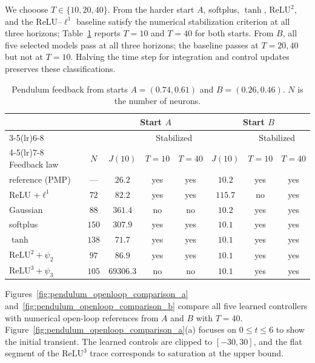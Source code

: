 \documentclass[11pt]{amsart}
\theoremstyle{definition}
\theoremstyle{remark}
\begin{document}
We chooose $T\in\{10,20,40\}$.
From the harder start $A$, softplus, $\tanh$, $\mathrm{ReLU}^{2}$, and
the ReLU--$\ell^1$ baseline satisfy the numerical stabilization criterion
at all three horizons; Table~\ref{tab:pendulum_feedback_a} reports
$T=10$ and $T=40$ for both starts.
From $B$, all five selected models pass at all three horizons;
the baseline passes at $T=20,40$ but not at $T=10$.
Halving the time step for integration and control updates preserves these
classifications.

\begin{table}[htbp]
\centering
\begin{tabular}{lc|ccc|ccc}
\toprule
 & & \multicolumn{3}{c|}{Start $A$} & \multicolumn{3}{c}{Start $B$} \\
\cmidrule(lr){3-5}\cmidrule(lr){6-8}
 & & & \multicolumn{2}{c|}{Stabilized} & & \multicolumn{2}{c}{Stabilized} \\
\cmidrule(lr){4-5}\cmidrule(lr){7-8}
Feedback law & $N$ & $J(10)$ & $T=10$ & $T=40$ & $J(10)$ & $T=10$ & $T=40$ \\
\midrule
reference (PMP) & --- & $26.2$ & yes & yes & $10.2$ & yes & yes \\
ReLU $+\ell^1$ & $72$ & $82.2$ & yes & yes & $115.7$ & no & yes \\
\midrule
Gaussian & $88$ & $361.4$ & no & no & $10.2$ & yes & yes \\
softplus & $150$ & $307.9$ & yes & yes & $10.1$ & yes & yes \\
$\tanh$ & $138$ & $71.7$ & yes & yes & $10.1$ & yes & yes \\
\midrule
$\mathrm{ReLU}^{2} + \psi_{2}$ & $97$ & $86.9$ & yes & yes & $10.1$ & yes & yes \\
$\mathrm{ReLU}^{3} + \psi_{3}$ & $105$ & $69306.3$ & no & no & $10.1$ & yes & yes \\
\bottomrule
\end{tabular}
\caption{Pendulum feedback from starts $A=(0.74,0.61)$ and $B=(0.26,0.46)$.
$N$ is the number of neurons.}
\label{tab:pendulum_feedback_a}
\end{table}

Figures~\ref{fig:pendulum_openloop_comparison_a}
and~\ref{fig:pendulum_openloop_comparison_b} compare all five learned
controllers with numerical open-loop references from $A$ and $B$ with $T=40$.
Figure~\ref{fig:pendulum_openloop_comparison_a}(a) focuses on $0\le t\le6$
to show the initial transient. The learned controls are clipped to $[-30,30]$,
and the flat segment of the $\mathrm{ReLU}^{3}$ trace corresponds to saturation
at the upper bound.
\end{document}
